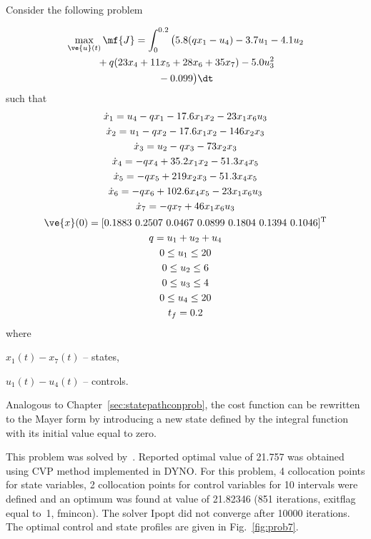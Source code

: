 Consider the following problem~\citep{luu90_52,bal01,fik02} 

\begin{gather}
\max_{\ve{u}(t)} \mf{J} =
\int_{0}^{0.2}\big(5.8(qx_{1}-u_{4})-3.7u_{1}-4.1u_{2}\nonumber\\ %
\mbox{}+q(23x_{4}+11x_{5}+28x_{6}+35x_{7})-5.0u_{3}^{2}\nonumber\\
\mbox{}-0.099\big)\dt \label{eq:cstr}
\end{gather}
such that
\begin{gather*}
\dot{x}_1  =  u_{4}-qx_{1}-17.6x_{1}x_{2}-23x_{1}x_{6}u_{3}\\
\dot{x}_2  =  u_{1}-qx_{2}-17.6x_{1}x_{2}-146x_{2}x_{3}\\
\dot{x}_3  =  u_{2}-qx_{3}-73x_{2}x_{3}\\
\dot{x}_4  =  -qx_{4}+35.2x_{1}x_{2}-51.3x_{4}x_{5}\\
\dot{x}_5  =  -qx_{5}+219x_{2}x_{3}-51.3x_{4}x_{5}\\
\dot{x}_6  =  -qx_{6}+102.6x_{4}x_{5}-23x_{1}x_{6}u_{3}\\
\dot{x}_7  =  -qx_{7}+46x_{1}x_{6}u_{3}\\
\ve{x}(0) = [0.1883~0.2507~0.0467~0.0899~0.1804~0.1394~0.1046]^{\textrm{T}}\\
q = u_{1}+u_{2}+u_{4}\\
0 \leq u_{1} \leq 20\\
0 \leq u_{2} \leq 6\\
0 \leq u_{3} \leq 4\\
0 \leq u_{4} \leq 20\\
t_{f}=0.2
\end{gather*}
where 
\begin{description}
\item $x_{1}(t) - x_{7}(t)$ -- states,
\item $u_{1}(t) - u_{4}(t)$ -- controls.
\end{description}
Analogous to Chapter~\ref{sec:statepathconprob}, the cost function
can be rewritten to the Mayer form by introducing a new state defined
by the integral function with its initial value equal to zero.

This problem was solved by~\cite{fik02,jac69}. Reported optimal value
of 21.757 was obtained using CVP method implemented in DYNO. For this
problem, 4 collocation points for state variables, 2 collocation
points for control variables for 10 intervals were defined and an
optimum was found at value of 21.82346 (851 iterations, exitflag equal
to~1, fmincon). The solver Ipopt did not converge after 10000
iterations. The optimal control and state profiles are given in
Fig.~\ref{fig:prob7}.

